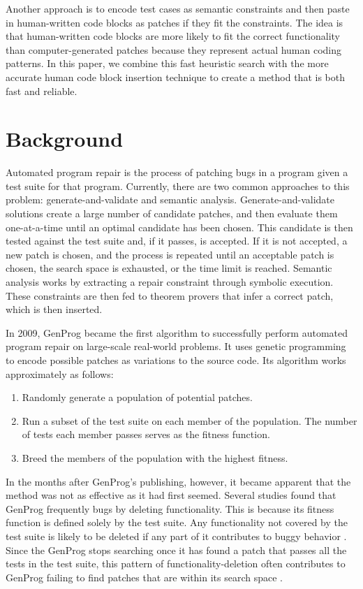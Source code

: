 \documentclass[conference]{IEEEtran}
\begin{document}
Another approach is to encode test cases as semantic constraints and then paste in human-written code blocks as patches if they fit the constraints. The idea is that human-written code blocks are more likely to fit the correct functionality than computer-generated patches because they represent actual human coding patterns. In this paper, we combine this fast heuristic search with the more accurate human code block insertion technique to create a method that is both fast and reliable. 



\section{Background}

Automated program repair is the process of patching bugs in a program given a test suite for that program. 
Currently, there are two common approaches to this problem: generate-and-validate and semantic analysis. 
Generate-and-validate solutions create a large number of candidate patches, and then evaluate them one-at-a-time until an optimal candidate has been chosen. 
This candidate is then tested against the test suite and, if it passes, is accepted. 
If it is not accepted, a new patch is chosen, and the process is repeated until an acceptable patch is chosen, the search space is exhausted, or the time limit is reached. 
Semantic analysis works by extracting a repair constraint through symbolic execution. These constraints are then fed to theorem provers that infer a correct patch, which is then inserted. 

In 2009, GenProg became the first algorithm to successfully perform automated program repair on large-scale real-world problems. 
It uses genetic programming to encode possible patches as variations to the source code. 
Its algorithm works approximately as follows:
\begin{enumerate}
\item Randomly generate a population of potential patches.
\item Run a subset of the test suite on each member of the population. The number of tests each member passes serves as the fitness function.
\item Breed the members of the population with the highest fitness.
\end{enumerate}

In the months after GenProg's publishing, however, it became apparent that the method was not as effective as it had first seemed. 
Several studies found that GenProg frequently  bugs by deleting functionality. 
This is because its fitness function is defined solely by the test suite. 
Any functionality not covered by the test suite is likely to be deleted if any part of it contributes to buggy behavior \cite{plausibility}. 
Since the GenProg stops searching once it has found a patch that passes all the tests in the test suite, this pattern of functionality-deletion often contributes to GenProg failing to find patches that are within its search space \cite{searchspace}.
\end{document}
